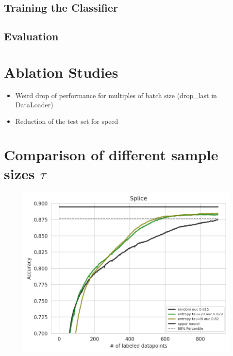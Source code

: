 \documentclass[]{article}
\begin{document}
\subsection{Training the Classifier}\label{sec:training_the_classifier}
\subsection{Evaluation}\label{sec:evaluation}


\section{Ablation Studies}
\begin{itemize}
	\item Weird drop of performance for multiples of batch size (drop\_last in DataLoader)
	\item Reduction of the test set for speed
\end{itemize}



 

\appendix

\section{Comparison of different sample sizes $\tau$}
\begin{figure}[H]
	\centering
	\includegraphics[width=0.7\linewidth]{img/tau_ablation.png}
\end{figure}
\end{document}
